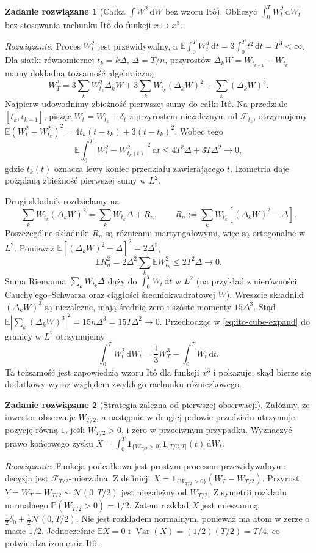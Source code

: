 \documentclass[11pt,a4paper,oneside]{report}
\numberwithin{equation}{chapter}
\theoremstyle{plain}
\theoremstyle{definition}
\newtheorem{zadanie}{Zadanie rozwiązane}[chapter]
\theoremstyle{remark}
\newcommand{\Prob}{\mathbb{P}}
\newcommand{\E}{\mathbb{E}}
\newcommand{\Var}{\operatorname{Var}}
\newcommand{\calF}{\mathcal{F}}
\newcommand{\ind}[1]{\mathbf{1}_{#1}}
\newcommand{\dd}{\mathrm{d}}
\newcommand{\Normal}{\mathcal{N}}
\begin{document}
\begin{zadanie}[Całka $\int W^2\,\dd W$ bez wzoru Itô]
Obliczyć $\int_0^T W_t^2\,\dd W_t$ bez stosowania
rachunku Itô do funkcji $x\mapsto x^3$.

\emph{Rozwiązanie.} Proces $W_t^2$ jest przewidywalny,
a $\E\int_0^T W_t^4\,\dd t
=3\int_0^T t^2\,\dd t=T^3<\infty$.
Dla siatki równomiernej $t_k=k\Delta$, $\Delta=T/n$,
przyrostów $\Delta_kW=W_{t_{k+1}}-W_{t_k}$ mamy
dokładną tożsamość algebraiczną
\[
W_T^3
=3\sum_kW_{t_k}^2\Delta_kW
+3\sum_kW_{t_k}(\Delta_kW)^2
+\sum_k(\Delta_kW)^3.
\tag{2.14}\label{eq:ito-cube-expand}
\]
Najpierw udowodnimy zbieżność pierwszej sumy do całki Itô.
Na przedziale $[t_k,t_{k+1}]$, pisząc
$W_t=W_{t_k}+\delta_t$ z przyrostem niezależnym od
$\calF_{t_k}$, otrzymujemy
$\E(W_t^2-W_{t_k}^2)^2
=4t_k(t-t_k)+3(t-t_k)^2$.
Wobec tego
\[
\E\int_0^T|W_t^2-W_{t_k(t)}^2|^2\,\dd t
\le 4T^2\Delta+3T\Delta^2\longrightarrow0,
\]
gdzie $t_k(t)$ oznacza lewy koniec przedziału
zawierającego $t$. Izometria daje pożądaną zbieżność
pierwszej sumy w $L^2$.

Drugi składnik rozdzielamy na
\[
\sum_kW_{t_k}(\Delta_kW)^2
=\sum_kW_{t_k}\Delta+R_n,\qquad
R_n:=\sum_kW_{t_k}[(\Delta_kW)^2-\Delta].
\]
Poszczególne składniki $R_n$ są różnicami
martyngałowymi, więc są ortogonalne w $L^2$. Ponieważ
$\E[(\Delta_kW)^2-\Delta]^2=2\Delta^2$,
\[
\E R_n^2
=2\Delta^2\sum_k\E W_{t_k}^2
\le2T^2\Delta\longrightarrow0.
\]
Suma Riemanna $\sum_kW_{t_k}\Delta$ dąży do
$\int_0^TW_t\,\dd t$ w $L^2$ (na przykład
z nierówności Cauchy'ego--Schwarza oraz ciągłości
średniokwadratowej $W$). Wreszcie składniki
$(\Delta_kW)^3$ są niezależne, mają średnią zero
i szóste momenty $15\Delta^3$. Stąd
$\E|\sum_k(\Delta_kW)^3|^2=15n\Delta^3=15T\Delta^2\to0$.
Przechodząc w \eqref{eq:ito-cube-expand} do granicy w $L^2$
otrzymujemy
\[
\int_0^TW_t^2\,\dd W_t
=\frac13W_T^3-\int_0^TW_t\,\dd t.
\tag{2.15}\label{eq:W2-dW}
\]
Ta tożsamość jest zapowiedzią wzoru Itô dla
funkcji $x^3$ i pokazuje, skąd bierze się dodatkowy
wyraz względem zwykłego rachunku różniczkowego.
\end{zadanie}

\begin{zadanie}[Strategia zależna od pierwszej obserwacji]
Załóżmy, że inwestor obserwuje $W_{T/2}$, a następnie
w drugiej połowie przedziału utrzymuje pozycję równą
$1$, jeśli $W_{T/2}>0$, i zero w przeciwnym przypadku.
Wyznaczyć prawo końcowego zysku
$X=\int_0^T\ind{\{W_{T/2}>0\}}\ind{(T/2,T]}(t)\,\dd W_t$.

\emph{Rozwiązanie.} Funkcja podcałkowa jest prostym
procesem przewidywalnym: decyzja jest
$\calF_{T/2}$-mierzalna. Z definicji
$X=\ind{\{W_{T/2}>0\}}(W_T-W_{T/2})$.
Przyrost $Y=W_T-W_{T/2}\sim\Normal(0,T/2)$ jest
niezależny od $W_{T/2}$. Z symetrii rozkładu normalnego
$\Prob(W_{T/2}>0)=1/2$. Zatem rozkład $X$ jest mieszaniną
$\frac12\delta_0+\frac12\Normal(0,T/2)$.
Nie jest rozkładem normalnym, ponieważ ma atom
w zerze o masie $1/2$. Jednocześnie
$\E X=0$ i $\Var(X)=(1/2)(T/2)=T/4$,
co potwierdza izometria Itô.
\end{zadanie}
\end{document}
